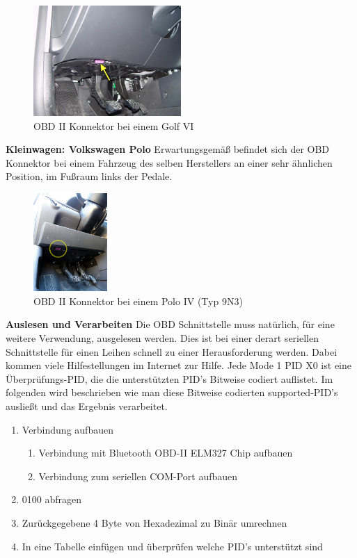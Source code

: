 \begin{figure}[!htb]\centering
	\includegraphics[width=0.5\textwidth]{images/golfobd}
	\caption{OBD II Konnektor bei einem Golf VI \cite{SIMR.CH2-obd2.GolfOBD}}\label{Fig:Data3}
\end{figure}

\clearpage

\textbf{Kleinwagen: Volkswagen Polo}
Erwartungsgemäß befindet sich der OBD Konnektor bei einem Fahrzeug des selben Herstellers an einer sehr ähnlichen Position, im Fußraum links der Pedale.

\begin{figure}[!htb]\centering
	\includegraphics[width=0.25\textwidth]{images/poloobd}
	\caption{OBD II Konnektor bei einem Polo IV (Typ 9N3) \cite{SIMR.CH2-obd2.PoloOBD}}\label{Fig:Data3}
\end{figure}

\textbf{Auslesen und Verarbeiten\nextline}
Die OBD Schnittstelle muss natürlich, für eine weitere Verwendung,  ausgelesen werden. Dies ist bei einer derart seriellen Schnittstelle für einen Leihen schnell zu einer Herausforderung werden. Dabei kommen viele Hilfestellungen im Internet zur Hilfe. Jede Mode 1 PID X0 ist eine Überprüfungs-PID, die die unterstützten PID's Bitweise codiert auflistet. Im folgenden wird beschrieben wie man diese Bitweise codierten supported-PID's ausließt und das Ergebnis verarbeitet.

\begin{enumerate}
	\item Verbindung aufbauen
	\begin{enumerate}
		\item Verbindung mit Bluetooth OBD-II ELM327 Chip aufbauen
		\item Verbindung zum seriellen COM-Port aufbauen 
	\end{enumerate}
	\item 0100 abfragen
	\item Zurückgegebene 4 Byte von Hexadezimal zu Binär umrechnen
	\item In eine Tabelle einfügen und überprüfen welche PID's unterstützt sind
\end{enumerate}

